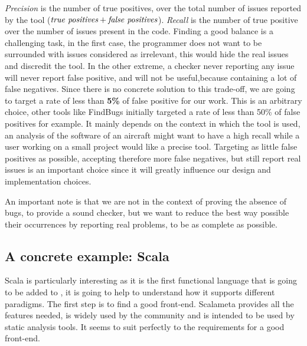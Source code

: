 \emph{Precision} is the number of true positives, over the total number of issues reported by the tool ($ \emph{true positives} + \emph{false positives} $). \emph{Recall} is the number of true positive over the number of issues present in the code. 
Finding a good balance is a challenging task, in the first case, the programmer does not want to be surrounded with issues considered as irrelevant, this would hide the real issues and discredit the tool.
In the other extreme, a checker never reporting any issue will never report false positive, and will not be useful,because containing a lot of false negatives. 
Since there is no concrete solution to this trade-off, we are going to target a rate of less than \textbf{5\%} of false positive for our work.
This is an arbitrary choice, other tools like FindBugs \cite{Hovemeyer:2004:FBE:1052883.1052895} initially targeted a rate of less than 50\% of false positives for example. 
It mainly depends on the context in which the tool is used, an analysis of the software of an aircraft might want to have a high recall while a user working on a small project would like a precise tool. 
Targeting as little false positives as possible, accepting therefore more false negatives, but still report real issues is an important choice since it will greatly influence our design and implementation choices.

An important note is that we are not in the context of proving the absence of bugs, to provide a sound checker, but we want to reduce the best way possible their occurrences by reporting real problems, to be as complete as possible.

\subsection{A concrete example: Scala}
\label{subsec:concrete_example}

Scala is particularly interesting as it is the first functional language that is going to be added to \slang{}, it is going to help to understand how it supports different paradigms.
The first step is to find a good front-end.
Scalameta \cite{Scalameta:2019:Online} provides all the features needed, is widely used by the community and is intended to be used by static analysis tools. 
It seems to suit perfectly to the requirements for a good front-end.

